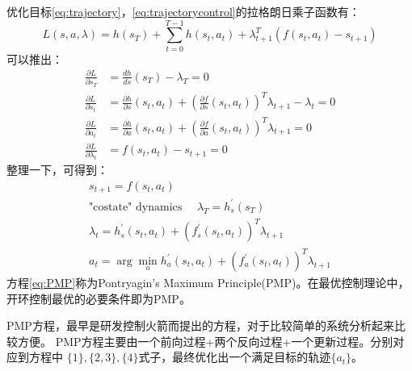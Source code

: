 \documentclass[lang=cn,newtx,10pt,scheme=chinese]{elegantbook}
\begin{document}
优化目标\ref{eq:trajectory}，\ref{eq:trajectorycontrol}的拉格朗日乘子函数有：
\begin{equation}
  L(s, a, \lambda)=h\left(s_T\right)+\sum_{t=0}^{T-1} h\left(s_t, a_t\right)+\lambda_{t+1}^T\left(f\left(s_t, a_t\right)-s_{t+1}\right)
\end{equation}
可以推出：
\begin{equation}
  \begin{aligned}
  \frac{\partial L}{\partial s_T} & =\frac{d h}{d s}\left(s_T\right)-\lambda_T=0 \\
  \frac{\partial L}{\partial s_t} & =\frac{\partial h}{\partial s}\left(s_t, a_t\right)+\left(\frac{\partial f}{\partial s}\left(s_t, a_t\right)\right)^T \lambda_{t+1}-\lambda_t=0 \\
  \frac{\partial L}{\partial a_t} & =\frac{\partial h}{\partial a}\left(s_t, a_t\right)+\left(\frac{\partial f}{\partial a}\left(s_t, a_t\right)\right)^T \lambda_{t+1}=0 \\
  \frac{\partial L}{\partial \lambda_t} & =f\left(s_t, a_t\right)-s_{t+1}=0
  \end{aligned}
\end{equation}
整理一下，可得到：
\begin{equation}
  \label{eq:PMP}
  \begin{array}{r}
    s_{t+1}=f\left(s_t, a_t\right) \\
  \text {"costate" dynamics } \quad \lambda_T=h_s^{\prime}\left(s_T\right) \\
  \lambda_t=h_s^{\prime}\left(s_t, a_t\right)+\left(f_s^{\prime}\left(s_t, a_t\right)\right)^T \lambda_{t+1} \\
  a_t=\arg \min _a h_a^{\prime}\left(s_t, a_t\right)+\left(f_a^{\prime}\left(s_t, a_t\right)\right)^T \lambda_{t+1}
  \end{array}
\end{equation}
方程\ref{eq:PMP}称为Pontryagin’s Maximum Principle(PMP)。在最优控制理论中，
开环控制最优的必要条件即为PMP。

PMP方程，最早是研发控制火箭而提出的方程，对于比较简单的系统分析起来比较方便。
PMP方程主要由一个前向过程+两个反向过程+一个更新过程。分别对应到方程中
$\{1\},\{2,3\},\{4\}$式子，最终优化出一个满足目标的轨迹$\{a_t\}$。
\end{document}
